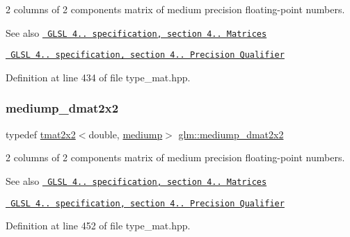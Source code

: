 2 columns of 2 components matrix of medium precision floating-\/point numbers.

\begin{DoxySeeAlso}{See also}
\href{http://www.opengl.org/registry/doc/GLSLangSpec.4.20.8.pdf}{\texttt{ G\+L\+SL 4.. specification, section 4.. Matrices}} 

\href{http://www.opengl.org/registry/doc/GLSLangSpec.4.20.8.pdf}{\texttt{ G\+L\+SL 4.. specification, section 4.. Precision Qualifier}} 
\end{DoxySeeAlso}


Definition at line 434 of file type\+\_\+mat.\+hpp.

\mbox{\label{group__core__precision_ga949bee59342f1c3258522bacd07ffe95}} 
\subsubsection{\texorpdfstring{mediump\_dmat2x2}{mediump\_dmat2x2}}
{\footnotesize\ttfamily typedef \mbox{\hyperlink{structglm_1_1tmat2x2}{tmat2x2}}$<$double, \mbox{\hyperlink{namespaceglm_a0f04f086094c747d227af4425893f545a6416f3ea0c9025fb21ed50c4d6620482}{mediump}}$>$ \mbox{\hyperlink{group__core__precision_ga949bee59342f1c3258522bacd07ffe95}{glm\+::mediump\+\_\+dmat2x2}}}

2 columns of 2 components matrix of medium precision floating-\/point numbers.

\begin{DoxySeeAlso}{See also}
\href{http://www.opengl.org/registry/doc/GLSLangSpec.4.20.8.pdf}{\texttt{ G\+L\+SL 4.. specification, section 4.. Matrices}} 

\href{http://www.opengl.org/registry/doc/GLSLangSpec.4.20.8.pdf}{\texttt{ G\+L\+SL 4.. specification, section 4.. Precision Qualifier}} 
\end{DoxySeeAlso}


Definition at line 452 of file type\+\_\+mat.\+hpp.

\mbox{\label{group__core__precision_ga0b187380697f66a25000b307db9cb41a}} 
